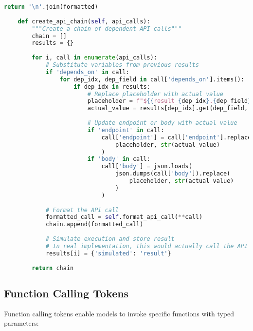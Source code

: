 \begin{lstlisting}[language=Python, caption=Structured API call tokenization]
        return '\n'.join(formatted)
    
    def create_api_chain(self, api_calls):
        """Create a chain of dependent API calls"""
        chain = []
        results = {}
        
        for i, call in enumerate(api_calls):
            # Substitute variables from previous results
            if 'depends_on' in call:
                for dep_idx, dep_field in call['depends_on'].items():
                    if dep_idx in results:
                        # Replace placeholder with actual value
                        placeholder = f"${{result_{dep_idx}.{dep_field}}}"
                        actual_value = results[dep_idx].get(dep_field, '')
                        
                        # Update endpoint or body with actual value
                        if 'endpoint' in call:
                            call['endpoint'] = call['endpoint'].replace(
                                placeholder, str(actual_value)
                            )
                        if 'body' in call:
                            call['body'] = json.loads(
                                json.dumps(call['body']).replace(
                                    placeholder, str(actual_value)
                                )
                            )
            
            # Format the API call
            formatted_call = self.format_api_call(**call)
            chain.append(formatted_call)
            
            # Simulate execution and store result
            # In real implementation, this would actually call the API
            results[i] = {'simulated': 'result'}
        
        return chain
\end{lstlisting}

\subsection{Function Calling Tokens}

Function calling tokens enable models to invoke specific functions with typed parameters:


